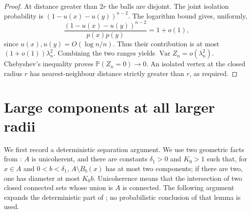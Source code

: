 \documentclass[11pt]{article}
\theoremstyle{remark}
\newcommand{\Pp}{\mathbb P}
\begin{document}
\begin{proof}
At distance greater than $2r$ the balls are disjoint. The joint isolation
probability is $(1-u(x)-u(y))^{n-2}$. The logarithm bound gives, uniformly,
\[
 \frac{(1-u(x)-u(y))^{n-2}}{p(x)p(y)}=1+o(1),
\]
since $u(x),u(y)=O(\log n/n)$. Thus their contribution is at most
$(1+o(1))\lambda_n^2$. Combining the two ranges yields
$\operatorname{Var}Z_n=o(\lambda_n^2)$. Chebyshev's inequality proves
$\Pp(Z_n=0)\to0$. An isolated vertex at the closed radius $r$ has
nearest-neighbour distance strictly greater than $r$, as required.
\end{proof}

\section{Large components at all larger radii}
We first record a deterministic separation argument. We use two geometric
facts from \cite[Lemma~3.14 and Proposition~3.15]{PYH}: $A$ is unicoherent,
and there are constants $\delta_1>0$ and $K_0>1$ such that, for $x\in A$
and $0<b<\delta_1$, $A\setminus B_b(x)$ has at most two components; if
there are two, one has diameter at most $K_0b$. Unicoherence means that the
intersection of two closed connected sets whose union is $A$ is connected.
The following argument expands the deterministic part of
\cite[proof of Lemma~3.12, equation~(3.18)]{PYH}; no probabilistic conclusion
of that lemma is used.
\end{document}
